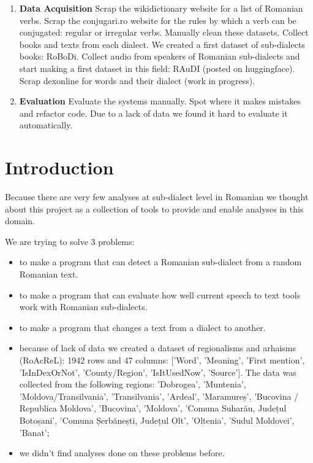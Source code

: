 \documentclass[11pt]{article}
\begin{document}
\begin{enumerate}
    \item \textbf{Data Acquisition}
        \subitem Scrap the wikidictionary website for a list of Romanian verbs.
        \subitem Scrap the conjugari.ro website for the rules by which a verb can be conjugated: regular or irregular verbs.
        \subitem Manually clean these datasets.
        \subitem Collect books and texts from each dialect. We created a first dataset of sub-dialects books: RoBoDi.
        \subitem Collect audio from speakers of Romanian sub-dialects and start making a first dataset in this field: RAuDI (posted on huggingface).
        \subitem Scrap dexonline for words and their dialect (work in progress).
    \item \textbf{Evaluation}
        \subitem Evaluate the systems manually.
        \subitem Spot where it makes mistakes and refactor code.
        \subitem Due to a lack of data we found it hard to evaluate it automatically.
\end{enumerate}


\newpage

\section{Introduction}
\label{section:intro}

Because there are very few analyses at sub-dialect level in Romanian we thought about this project as a collection of tools to provide and enable analyses in this domain.

We are trying to solve 3 problems:
\begin{itemize}
	\item to make a program that can detect a Romanian sub-dialect from a random Romanian text.
	\item to make a program that can evaluate how well current speech to text tools work with Romanian sub-dialects.
	\item to make a program that changes a text from a dialect to another.
	\item because of lack of data we created a dataset of regionalisms and arhaisms (RoAcReL): 1942 rows and 47 columns: ['Word', 'Meaning', 'First mention', 'IsInDexOrNot', 'County/Region', 'IsItUsedNow', 'Source']. The data was collected from the following regions: 'Dobrogea', 'Muntenia', 'Moldova/Transilvania', 'Transilvania', 'Ardeal', 'Maramureș', 'Bucovina / Republica Moldova', 'Bucovina', 'Moldova', 'Comuna Suharău, Județul Botoșani', 'Comuna Șerbănești, Județul Olt', 'Oltenia', 'Sudul Moldovei', 'Banat';
	\item we didn't find analyses done on these problems before.
\end{itemize}
\end{document}
